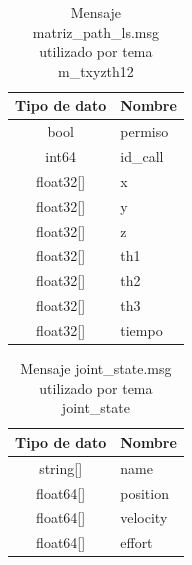         \begingroup
            \renewcommand{\arraystretch}{1.5}
            \begin{table}[H]
                \centering
                \begin{tabular}{c m{2.5cm}}
                   \hline                   
                   \textbf{Tipo de dato}  & \textbf{Nombre}    \\\hline \hline 
                   bool &  permiso
                   \\\hline
                   int64 &  id\_call
                   \\\hline
                   float32[] &  x
                   \\\hline
                   float32[] &  y
                   \\\hline
                   float32[] &  z
                   \\\hline
                   float32[] &  th1
                   \\\hline
                   float32[] &  th2
                   \\\hline
                   float32[] &  th3
                   \\\hline
                   float32[] &  tiempo
                      \\\hline                   
                \end{tabular}
                \caption{Mensaje matriz\_path\_ls.msg utilizado por tema m\_txyzth12}
                \label{tab:cap6_rviz_1_msg}
            \end{table}
        \endgroup
        
        \begingroup
            \renewcommand{\arraystretch}{1.5}
            \begin{table}[H]
                \centering
                \begin{tabular}{c m{2.5cm}}
                   \hline                   
                   \textbf{Tipo de dato}  & \textbf{Nombre}    \\\hline \hline 
                    string[]  & name
                   \\\hline
                    float64[]  & position
                   \\\hline
                    float64[]  & velocity
                   \\\hline
                    float64[] &  effort
                    \\\hline                   
                \end{tabular}
                \caption{Mensaje joint\_state.msg utilizado por tema joint\_state}
                \label{tab:cap6_rviz_2_msg}
            \end{table}
        \endgroup

